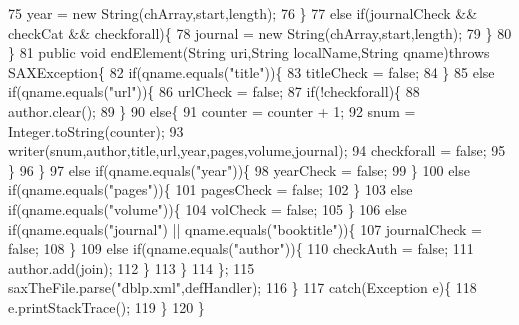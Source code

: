 \begin{DoxyCode}
75                         year = \textcolor{keyword}{new} String(chArray,start,length);
76                     \}
77                     \textcolor{keywordflow}{else} \textcolor{keywordflow}{if}(journalCheck && checkCat && checkforall)\{
78                         journal = \textcolor{keyword}{new} String(chArray,start,length);
79                     \}
80                 \}
81                 \textcolor{keyword}{public} \textcolor{keywordtype}{void} endElement(String uri,String localName,String qname)\textcolor{keywordflow}{throws} SAXException\{
82                     \textcolor{keywordflow}{if}(qname.equals(\textcolor{stringliteral}{"title"}))\{
83                         titleCheck = \textcolor{keyword}{false};
84                     \}
85                     \textcolor{keywordflow}{else} \textcolor{keywordflow}{if}(qname.equals(\textcolor{stringliteral}{"url"}))\{
86                         urlCheck = \textcolor{keyword}{false};
87                         \textcolor{keywordflow}{if}(!checkforall)\{
88                             author.clear();
89                         \}
90                         \textcolor{keywordflow}{else}\{
91                             counter = counter + 1;
92                             snum = Integer.toString(counter);
93                             writer(snum,author,title,url,year,pages,volume,journal);
94                             checkforall = \textcolor{keyword}{false};                
95                         \}
96                     \}
97                     \textcolor{keywordflow}{else} \textcolor{keywordflow}{if}(qname.equals(\textcolor{stringliteral}{"year"}))\{
98                         yearCheck = \textcolor{keyword}{false};
99                     \}
100                     \textcolor{keywordflow}{else} \textcolor{keywordflow}{if}(qname.equals(\textcolor{stringliteral}{"pages"}))\{
101                         pagesCheck = \textcolor{keyword}{false};
102                     \}
103                     \textcolor{keywordflow}{else} \textcolor{keywordflow}{if}(qname.equals(\textcolor{stringliteral}{"volume"}))\{
104                         volCheck = \textcolor{keyword}{false};
105                     \}
106                     \textcolor{keywordflow}{else} \textcolor{keywordflow}{if}(qname.equals(\textcolor{stringliteral}{"journal"}) || qname.equals(\textcolor{stringliteral}{"booktitle"}))\{
107                         journalCheck = \textcolor{keyword}{false};
108                     \}
109                     \textcolor{keywordflow}{else} \textcolor{keywordflow}{if}(qname.equals(\textcolor{stringliteral}{"author"}))\{
110                         checkAuth = \textcolor{keyword}{false};
111                         author.add(join);
112                     \}
113                 \}
114             \};
115             saxTheFile.parse(\textcolor{stringliteral}{"dblp.xml"},defHandler);
116         \}
117         \textcolor{keywordflow}{catch}(Exception e)\{
118             e.printStackTrace();
119         \}
120     \}
\end{DoxyCode}
